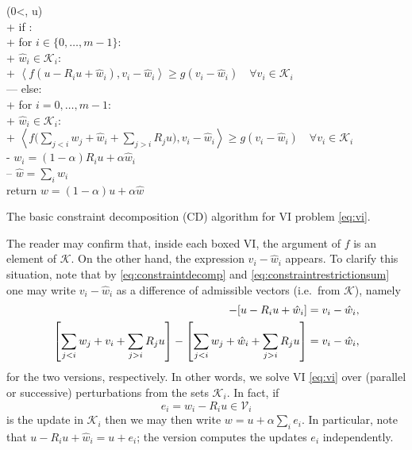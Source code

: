 \documentclass[letterpaper,final,12pt,reqno]{amsart}
\theoremstyle{cstyle}
\theoremstyle{cstyle*}
\theoremstyle{dstyle}
\numberwithin{equation}{section}
\numberwithin{figure}{section}
\numberwithin{table}{section}
\numberwithin{theorem}{section}
\newcommand{\cK}{\mathcal{K}}
\newcommand{\cV}{\mathcal{V}}
\newcommand{\ip}[2]{\left<#1,#2\right>}
\begin{document}
\begin{pseudofloat}
\begin{pseudo*}
(0<\alpha{}, u\in\cK)\text{:} \\+
    if : \\+
        for $i \in \{0,\dots,m-1\}$: \\+
            $\hat w_i\in \cK_i$: \\+
                 $\boxed{\ip{f(u - R_i u + \hat w_i)}{v_i-\hat w_i} \ge g(v_i-\hat w_i)} \quad \forall v_i\in \cK_i$ \\---
    else: \\+
        for $i = 0,\dots,m-1$: \\+
            $\hat w_i\in \cK_i$: \\+
                $\displaystyle \boxed{\ip{f\Big(\sum_{j<i} w_j + \hat w_i + \sum_{j>i} R_j u\Big)}{v_i-\hat w_i} \ge g(v_i-\hat w_i)} \quad \forall v_i\in \cK_i$ \\-
            $w_i = (1-\alpha) R_i u + \alpha \hat w_i$ \\--
    $\hat w = \sum_i \hat w_i$ \\
    return $w=(1-\alpha) u + \alpha \hat w$
\end{pseudo*}
\caption{The basic constraint decomposition (CD) algorithm for VI problem \eqref{eq:vi}.}
\label{alg:basiccd}
\end{pseudofloat}

The reader may confirm that, inside each boxed VI, the argument of $f$ is an element of $\cK$.  On the other hand, the expression $v_i - \hat w_i$ appears.  To clarify this situation, note that by \eqref{eq:constraintdecomp} and \eqref{eq:constraintrestrictionsum} one may write $v_i - \hat w_i$ as a difference of admissible vectors (i.e.~from $\cK$), namely
\begin{align*}
[u - R_i u + v_i] - [u - R_i u + \hat w_i] &= v_i - \hat w_i, \label{eq:admissibledifference} \\
\left[\sum_{j<i} w_j + v_i + \sum_{j>i} R_j u\right] - \left[\sum_{j<i} w_j + \hat w_i + \sum_{j>i} R_j u\right] &= v_i - \hat w_i,  \notag
\end{align*}
for the two versions, respectively.  In other words, we solve VI \eqref{eq:vi} over (parallel or successive) perturbations from the sets $\cK_i$.  In fact, if
\begin{equation}
e_i = \hat w_i - R_i u \in \cV_i \label{eq:ithupdate}
\end{equation}
is the update in $\cK_i$ then we may then write $w = u + \alpha \sum_i e_i$.  In particular, note that $u - R_i u + \hat w_i = u + e_i$; the  version computes the updates $e_i$ independently.
\end{document}
